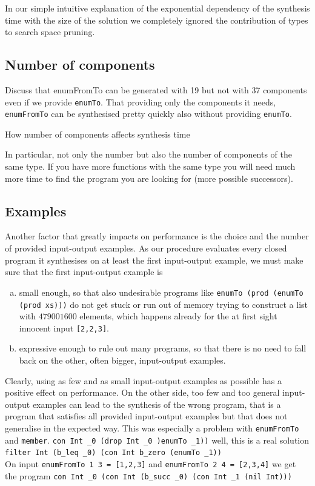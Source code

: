 In our simple intuitive explanation of the exponential dependency of the synthesis time with the size of the solution we completely ignored the contribution of types to search space pruning.

\subsection{Number of components}
Discuss that enumFromTo can be generated with 19 but not with 37 components even if we provide \lstinline?enumTo?. That providing only the components it needs, \lstinline?enumFromTo? can be synthesised pretty quickly also without providing \lstinline?enumTo?.

How number of components affects synthesis time

In particular, not only the number but also the number of components of the same type. If you have more functions with the same type you will need much more time to find the program you are looking for (more possible successors).

\subsection{Examples}
Another factor that greatly impacts on performance is the choice and the number of provided input-output examples. As our procedure evaluates every closed program it synthesises on at least the first input-output example, we must make sure that the first input-output example is
\begin{enumerate}[a.]
\item small enough, so that also undesirable programs like \lstinline?enumTo (prod (enumTo (prod xs)))? do not get stuck or run out of memory trying to construct a list with $479001600$ elements, which happens already for the at first sight innocent input \lstinline?[2,2,3]?.
\item expressive enough to rule out many programs, so that there is no need to fall back on the other, often bigger, input-output examples.
\end{enumerate}
Clearly, using as few and as small input-output examples as possible has a positive effect on performance. On the other side, too few and too general input-output examples can lead to the synthesis of the wrong program, that is a program that satisfies all provided input-output examples but that does not generalise in the expected way. This was especially a problem with \lstinline?enumFromTo? and \lstinline?member?.
\lstinline?con Int _0 (drop Int _0 )enumTo _1))? well, this is a real solution\\
\lstinline?filter Int (b_leq _0) (con Int b_zero (enumTo _1))?\\
On input \lstinline?enumFromTo 1 3 = [1,2,3]? and \lstinline?enumFromTo 2 4 = [2,3,4]? we get the program \lstinline?con Int _0 (con Int (b_succ _0) (con Int _1 (nil Int)))?

